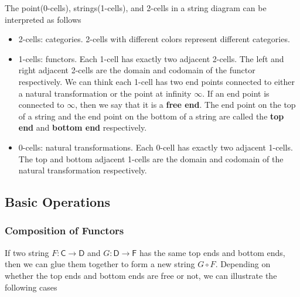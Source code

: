 The point(0-cells), strings(1-cells), and 2-cells in a string diagram can be interpreted as follows
\begin{itemize}
    \item 2-cells: categories. 2-cells with different colors represent different categories.
    \item 1-cells: functors. Each 1-cell has exactly two adjacent 2-cells. The left and right adjacent 2-cells are the domain and codomain of the functor respectively. We can think each 1-cell has two end points connected to either a natural transformation or the point at infinity $\infty$. If an end point is connected to $\infty$, then we say that it is a \textbf{free end}. The end point on the top of a string and the end point on the bottom of a string are called the \textbf{top end} and \textbf{bottom end} respectively.
    \item 0-cells: natural transformations. Each 0-cell has exactly two adjacent 1-cells. The top and bottom adjacent 1-cells are the domain and codomain of the natural transformation respectively. 
\end{itemize}

\subsection{Basic Operations}
\subsubsection{Composition of Functors}
If two string $F:\mathsf{C}\to\mathsf{D}$ and $G:\mathsf{D}\to\mathsf{F}$ has the same top ends and bottom ends, then we can glue them together to form a new string $G\circ F$. Depending on whether the top ends and bottom ends are free or not, we can illustrate the following cases


